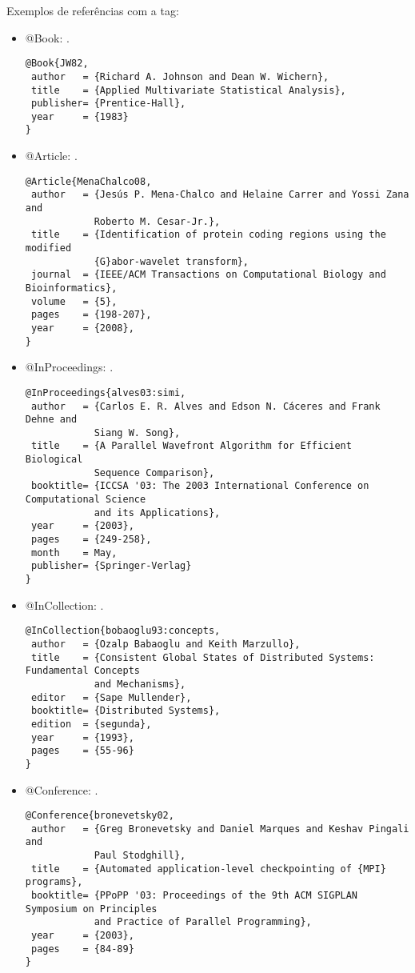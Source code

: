 Exemplos de referências com a tag:
\begin{itemize}
\item @Book: \citep{JW82}.
{\scriptsize\begin{verbatim}
@Book{JW82,
 author   = {Richard A. Johnson and Dean W. Wichern},
 title    = {Applied Multivariate Statistical Analysis},
 publisher= {Prentice-Hall},
 year     = {1983}
}
\end{verbatim}}

\item @Article: \citep{MenaChalco08}.
{\scriptsize\begin{verbatim}
@Article{MenaChalco08,
 author   = {Jesús P. Mena-Chalco and Helaine Carrer and Yossi Zana and 
            Roberto M. Cesar-Jr.},
 title    = {Identification of protein coding regions using the modified 
            {G}abor-wavelet transform},
 journal  = {IEEE/ACM Transactions on Computational Biology and Bioinformatics},
 volume   = {5},
 pages    = {198-207},
 year     = {2008},
}
\end{verbatim}}

\item @InProceedings: \citep{alves03:simi}.
{\scriptsize\begin{verbatim}
@InProceedings{alves03:simi,
 author   = {Carlos E. R. Alves and Edson N. Cáceres and Frank Dehne and 
            Siang W. Song},
 title    = {A Parallel Wavefront Algorithm for Efficient Biological 
            Sequence Comparison},
 booktitle= {ICCSA '03: The 2003 International Conference on Computational Science
            and its Applications},
 year     = {2003},
 pages    = {249-258},
 month    = May,
 publisher= {Springer-Verlag}
}
\end{verbatim}}

\item @InCollection: \citep{bobaoglu93:concepts}.
{\scriptsize\begin{verbatim}
@InCollection{bobaoglu93:concepts,
 author   = {Ozalp Babaoglu and Keith Marzullo},
 title    = {Consistent Global States of Distributed Systems: Fundamental Concepts
            and Mechanisms},
 editor   = {Sape Mullender},
 booktitle= {Distributed Systems},
 edition  = {segunda},
 year     = {1993},
 pages    = {55-96}
}
\end{verbatim}}

\item @Conference: \citep{bronevetsky02}.
{\scriptsize\begin{verbatim}
@Conference{bronevetsky02,
 author   = {Greg Bronevetsky and Daniel Marques and Keshav Pingali and 
            Paul Stodghill},
 title    = {Automated application-level checkpointing of {MPI} programs},
 booktitle= {PPoPP '03: Proceedings of the 9th ACM SIGPLAN Symposium on Principles
            and Practice of Parallel Programming},
 year     = {2003},
 pages    = {84-89}
}
\end{verbatim}}


\end{itemize}
